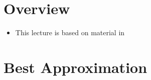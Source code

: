 \documentclass[11pt,twoside]{report}
\begin{document}



\section*{Overview} 

\begin{itemize}


\item This lecture is based on material in  \cite[Chapters 4 and 6]{chamberland:2023EF}%


\end{itemize}


\section{Best Approximation} 
\end{document}

